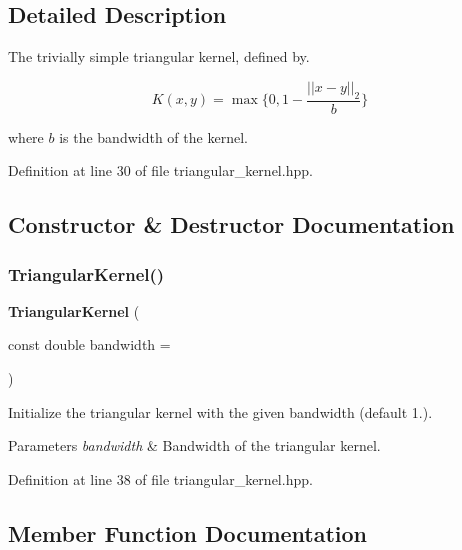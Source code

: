 \subsection{Detailed Description}
The trivially simple triangular kernel, defined by. 

\[ K(x, y) = \max \{ 0, 1 - \frac{|| x - y ||_2}{b} \} \]

where $ b $ is the bandwidth of the kernel. 

Definition at line 30 of file triangular\+\_\+kernel.\+hpp.



\subsection{Constructor \& Destructor Documentation}
\mbox{\label{classmlpack_1_1kernel_1_1TriangularKernel_a98b424666885d8f2fad1842a0a2351ed}} 
\subsubsection{Triangular\+Kernel()}
{\footnotesize\ttfamily \textbf{ Triangular\+Kernel} (\begin{DoxyParamCaption}\item[{const double}]{bandwidth = {} }\end{DoxyParamCaption})\hspace{0.3cm}{\ttfamily [inline]}}



Initialize the triangular kernel with the given bandwidth (default 1.). 


\begin{DoxyParams}{Parameters}
{\em bandwidth} & Bandwidth of the triangular kernel. \\
\hline
\end{DoxyParams}


Definition at line 38 of file triangular\+\_\+kernel.\+hpp.



\subsection{Member Function Documentation}
\mbox{\label{classmlpack_1_1kernel_1_1TriangularKernel_ae9cbd816179d6c36036139ccc8fea8c8}} 
